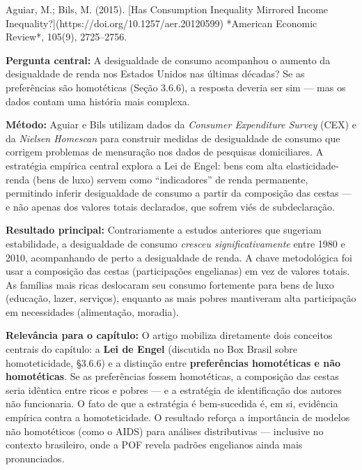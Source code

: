 \documentclass[11pt,twoside,openright]{book}
\begin{document}
\begin{pesquisabox}{Aguiar, M.; Bils, M. (2015). [Has Consumption Inequality Mirrored Income Inequality?](https://doi.org/10.1257/aer.20120599) *American Economic Review*, 105(9), 2725–2756.}

\textbf{Pergunta central:} A desigualdade de consumo acompanhou o
aumento da desigualdade de renda nos Estados Unidos nas últimas décadas?
Se as preferências são homotéticas (Seção 3.6.6), a resposta deveria ser
sim --- mas os dados contam uma história mais complexa.

\textbf{Método:} Aguiar e Bils utilizam dados da \emph{Consumer
Expenditure Survey} (CEX) e da \emph{Nielsen Homescan} para construir
medidas de desigualdade de consumo que corrigem problemas de mensuração
nos dados de pesquisas domiciliares. A estratégia empírica central
explora a Lei de Engel: bens com alta elasticidade-renda (bens de luxo)
servem como ``indicadores'' de renda permanente, permitindo inferir
desigualdade de consumo a partir da composição das cestas --- e não
apenas dos valores totais declarados, que sofrem viés de subdeclaração.

\textbf{Resultado principal:} Contrariamente a estudos anteriores que
sugeriam estabilidade, a desigualdade de consumo \emph{cresceu
significativamente} entre 1980 e 2010, acompanhando de perto a
desigualdade de renda. A chave metodológica foi usar a composição das
cestas (participações engelianas) em vez de valores totais. As famílias
mais ricas deslocaram seu consumo fortemente para bens de luxo
(educação, lazer, serviços), enquanto as mais pobres mantiveram alta
participação em necessidades (alimentação, moradia).

\textbf{Relevância para o capítulo:} O artigo mobiliza diretamente dois
conceitos centrais do capítulo: a \textbf{Lei de Engel} (discutida no
Box Brasil sobre homoteticidade, §3.6.6) e a distinção entre
\textbf{preferências homotéticas e não homotéticas}. Se as preferências
fossem homotéticas, a composição das cestas seria idêntica entre ricos e
pobres --- e a estratégia de identificação dos autores não funcionaria.
O fato de que a estratégia é bem-sucedida é, em si, evidência empírica
contra a homoteticidade. O resultado reforça a importância de modelos
não homotéticos (como o AIDS) para análises distributivas --- inclusive
no contexto brasileiro, onde a POF revela padrões engelianos ainda mais
pronunciados.

\end{pesquisabox}
\end{document}
